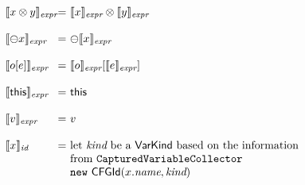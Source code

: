 \[\begin{array}{l@{}l@{~}l}
\transfun{x \inop y}_{\emph{expr}}
& = & \transfun{x}_{\emph{expr}} \inop \transfun{y}_{\emph{expr}}\\
& & \\

\transfun{\preop x}_{\emph{expr}}
& = & \preop \transfun{x}_{\emph{expr}}\\
& & \\

\transfun{o [e]}_{\emph{expr}}
 & = & \transfun{o}_{\emph{expr}} [ \transfun{e}_{\emph{expr}} ]\\
& & \\

\transfun{\this}_{\emph{expr}} & = & \this\\
& & \\

\transfun{v}_{\emph{expr}} & = & v\\
& & \\

\transfun{x}_{\emph{id}}
& = & \text{let }\emph{kind} \text{ be a } \VarKind \text{ based on the information}\\
& & \text{from } \TT{CapturedVariableCollector}\\
& & \new\ \CFGId(x.\emph{name}, \emph{kind})\\
\end{array}
\]
